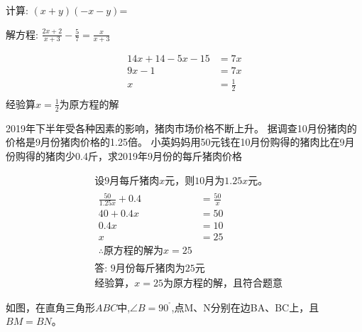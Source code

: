 \documentclass[answers]{exam}
\newcommand\degree{^\circ}
\begin{document}
\begin{questions}

\question
计算: $(x+y)(-x-y)$=\fillin[$-x^2-2xy-y^2$]

\question
解方程: $\frac{2x+2}{x+3}-\frac{5}{7}=\frac{x}{x+3}$

\begin{solution}
\[
\begin{aligned}
  14x+14-5x-15 &= 7x \\
  9x - 1 &= 7x \\
  x &= \frac{1}{2} \\
\end{aligned}
\]
经验算$x = \frac{1}{2}$为原方程的解
\end{solution}

\question
2019年下半年受各种因素的影响，猪肉市场价格不断上升。
据调查10月份猪肉的价格是9月份猪肉价格的1.25倍。
小英妈妈用50元钱在10月份购得的猪肉比在9月份购得的猪肉少0.4斤，求2019年9月份的每斤猪肉价格

\begin{solution}
  \[
\begin{aligned}
  & \mbox{设9月每斤猪肉$x$元，则10月为$1.25x$元。} \\
  & \begin{aligned}
  \frac{50}{1.25x}+0.4 &= \frac{50}{x} \\
  40 + 0.4x &= 50 \\
  0.4x &= 10 \\
  x &= 25 \\
  \therefore \mbox{原方程的解为} x = 25
  \end{aligned} \\
  & \mbox{答: 9月份每斤猪肉为25元} \\
  & \mbox{经验算，}x=25\mbox{为原方程的解，且符合题意}
\end{aligned}
\]
\end{solution}

\question 
如图，在直角三角形$ABC$中,$\angle B=90^{\degree}$,点M、N分别在边BA、BC上，且$BM=BN$。
  


\end{questions}
\end{document}

